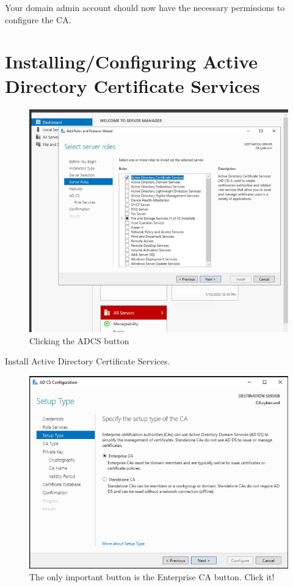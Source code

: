 \documentclass{article}
\begin{document}
Your domain admin account should now have the necessary permissions to configure the CA.

\section{Installing/Configuring Active Directory Certificate Services}

\begin{figure}[H]
        \centering
        \includegraphics[width=1\textwidth]{ServerManager.png}
        \caption{Clicking the ADCS button}
        \label{fig:ADCS}
\end{figure}

Install Active Directory Certificate Services.


\begin{figure}[H]
        \centering
        \includegraphics[width=1\textwidth]{EnterpriseCA.png}
        \caption{The only important button is the Enterprise CA button. Click it!}
        \label{fig:EnterpriseCA}
\end{figure}
\end{document}
